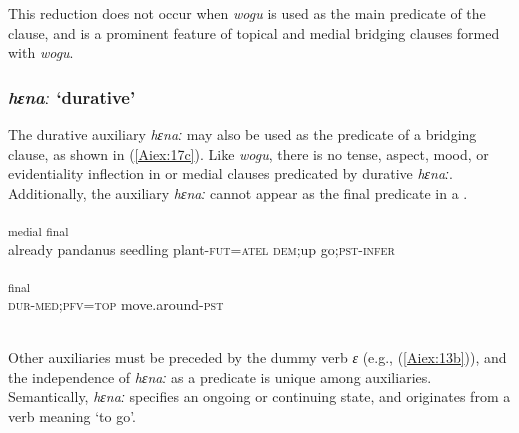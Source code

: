\documentclass[output=paper]{LSP/langsci}
\begin{document}
This reduction does not occur when \textit{wogu} is used as the main predicate of the clause, and is a prominent feature of topical and medial bridging clauses formed with \textit{wogu}.


\subsubsection{\textit{hɛnaː} `durative'} 
\label{Aiaspect.hena}
The durative auxiliary \textit{hɛnaː} may also be used as the predicate of a bridging clause, as shown in (\ref{Aiex:17c}). Like \textit{wogu}, there is no tense, aspect, mood, or evidentiality inflection in  or medial clauses predicated by durative \textit{hɛnaː}. Additionally, the auxiliary \textit{hɛnaː} cannot appear as the final predicate in a . 

\begin{exe}
\ex \label{Aiex:17ac}
\begin{xlist}
\ex \label{Aiex:17a}
\gll	[ɛimɛ	oɡa	ɛ	ɡɛ-mɛna=ta]\textsubscript{medial}	\underline{\smash{[holo}}	\underline{\smash{anɛ-obo]}}\textsubscript{final}\\
already	pandanus	seedling	plant-\textsc{fut=atel}	\textsc{dem;}up	go;\textsc{pst-infer}\\
\glt ‎\\
\ex \label{Aiex:17b}
\textsubscript{final}\\
\textsc{dur-med;pfv=top}	move.around\textsc{-pst}\\
\glt	{}\\
\end{xlist}
\end{exe}


Other auxiliaries must be preceded by the dummy verb \textit{ɛ} (e.g., (\ref{Aiex:13b})), and the independence of \textit{hɛnaː} as a predicate is unique among auxiliaries. Semantically, \textit{hɛnaː} specifies an ongoing  or continuing state, and originates from a verb meaning `to go'.
\end{document}
